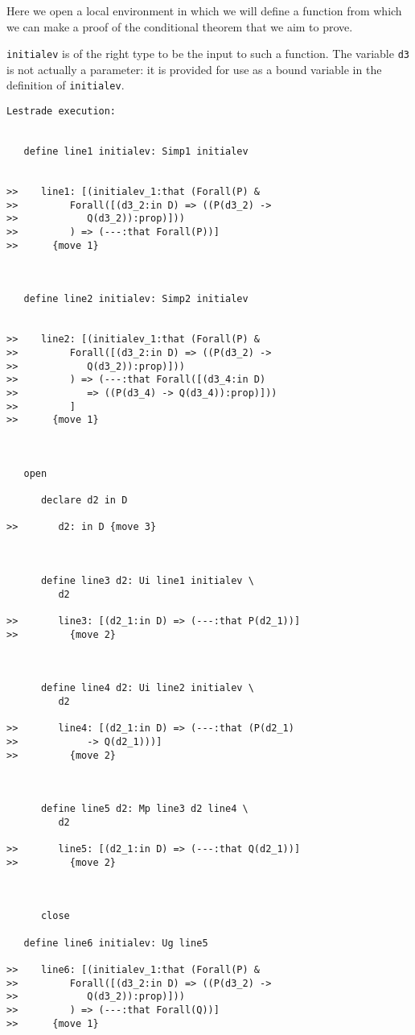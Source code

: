 \documentclass{slides}
\begin{document}
Here we open a local environment in which we will define a function from which we can make a proof of the conditional
theorem that we aim to prove.

{\tt initialev} is of the right type to be the input to such a function.  The variable {\tt d3} is not actually a parameter:
it is provided for use as a bound variable in the definition of {\tt initialev}.

\begin{slide}

\begin{verbatim}Lestrade execution:


   define line1 initialev: Simp1 initialev


>>    line1: [(initialev_1:that (Forall(P) &
>>         Forall([(d3_2:in D) => ((P(d3_2) ->
>>            Q(d3_2)):prop)]))
>>         ) => (---:that Forall(P))]
>>      {move 1}



   define line2 initialev: Simp2 initialev


>>    line2: [(initialev_1:that (Forall(P) &
>>         Forall([(d3_2:in D) => ((P(d3_2) ->
>>            Q(d3_2)):prop)]))
>>         ) => (---:that Forall([(d3_4:in D)
>>            => ((P(d3_4) -> Q(d3_4)):prop)]))
>>         ]
>>      {move 1}



   open

      declare d2 in D

>>       d2: in D {move 3}



      define line3 d2: Ui line1 initialev \
         d2

>>       line3: [(d2_1:in D) => (---:that P(d2_1))]
>>         {move 2}



      define line4 d2: Ui line2 initialev \
         d2

>>       line4: [(d2_1:in D) => (---:that (P(d2_1)
>>            -> Q(d2_1)))]
>>         {move 2}



      define line5 d2: Mp line3 d2 line4 \
         d2

>>       line5: [(d2_1:in D) => (---:that Q(d2_1))]
>>         {move 2}



      close

   define line6 initialev: Ug line5

>>    line6: [(initialev_1:that (Forall(P) &
>>         Forall([(d3_2:in D) => ((P(d3_2) ->
>>            Q(d3_2)):prop)]))
>>         ) => (---:that Forall(Q))]
>>      {move 1}




\end{verbatim}
\end{slide}
\end{document}
